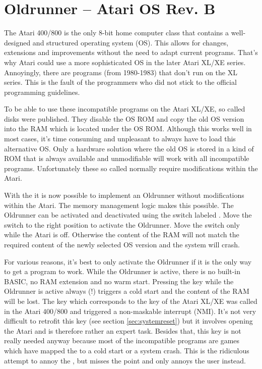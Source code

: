 \chapter{Oldrunner -- Atari OS Rev. B}
The Atari 400/800 is the only 8-bit home computer class that contains a
well-designed and structured operating system (OS). This allows for changes,
extensions and improvements without the need to adapt current programs.
That's why Atari could use a more sophisticated OS in the later Atari XL/XE
series. Annoyingly, there are programs (from 1980-1983) that don't run on the XL
series. This is the fault of the programmers who did not stick to the official
programming guidelines.

To be able to use these incompatible programs on the Atari XL/XE, so called
 disks were published. They disable the OS ROM and copy the old
OS version  into the RAM which is located under the OS ROM.
Although this works well in most cases, it's time consuming and unpleasant to
always have to load this alternative OS. Only a hardware solution where the old
OS is stored in a kind of ROM that is always available and unmodifiable will
work with all  incompatible programs. Unfortunately these so called
 normally require modifications within the Atari.

With the \frz it is now possible to implement an Oldrunner without modifications
within the Atari. The memory management logic makes this possible. The Oldrunner
can be activated and deactivated using the switch labeled . Move the
switch to the right position  to activate the Oldrunner. Move the
switch only while the Atari is off. Otherwise the content of the RAM will not
match the required content of the newly selected OS version and the system will
crash.

For various reasons, it's best to only activate the Oldrunner if it is the only
way to get a program to work. While the Oldrunner is active, there is no
built-in BASIC, no RAM extension and no warm start. Pressing the  key
while the Oldrunner is active always (!) triggers a cold start and the content
of the RAM will be lost. The key which corresponds to the  key of
the Atari XL/XE was called  in the Atari 400/800 and
triggered a non-maskable interrupt (NMI).  It's not very difficult to retrofit
this key (see section \ref{sec:systemreset}) but it involves opening the Atari
and is therefore rather an expert task. Besides that, this key is not really
needed anyway because most of the incompatible programs are games which have
mapped the  to a cold start or a system crash.
This is the ridiculous attempt to annoy the , but misses the point
and only annoys the user instead.

